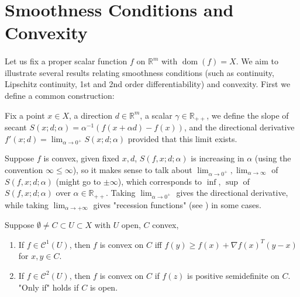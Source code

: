 \section{Smoothness Conditions and Convexity}
\label{sect:022}

\paragraph{}Let us fix a proper scalar function $f$ on $\mathbb{R}^m$ with $\operatorname{dom}(f)=X$. We aim to illustrate several results relating smoothness conditions (such as continuity, Lipschitz continuity, 1st and 2nd order differentiability) and convexity. First we define a common construction:

\begin{defn}\label{defn:022-secant-slope}
	Fix a point $x\in X$, a direction $d\in \mathbb{R}^m$, a scalar $\gamma \in \mathbb{R}_{++}$, we define the slope of secant $S(x; d; \alpha)=\alpha^{-1}(f(x+\alpha d)-f(x))$, and the directional derivative $f'(x; d)=\lim_{\alpha \to 0^+}S(x;d; \alpha )$ provided that this limit exists.
\end{defn}

\begin{rmrk}Suppose $f$ is convex, given fixed $x, d$, $S(f,x; d; \alpha)$ is increasing in $\alpha$ (using the convention $\infty\leq \infty$), so it makes sense to talk about $\lim_{\alpha \to0^+},\lim_{\alpha \to\infty}$ of $S(f,x; d; \alpha )$ (might go to $\pm\infty$), which corresponds to $\inf$, $\sup$ of $S(f,x; d; \alpha )$ over $\alpha \in \mathbb{R}_{++}$. Taking $\lim_{\alpha \to 0^+}$ gives the directional derivative, while taking $\lim_{\alpha \to +\infty}$ gives "recession functions" (see ) in some cases.
\end{rmrk}

\begin{prop}
	\label{prop:022-ordered-conditions-convexity}
	Suppose $\emptyset\neq C\subset U\subset X$ with $U$ open, $C$ convex,
	\begin{enumerate}[label=(\alph*)]
		\item If $f\in\mathscr{C}^1(U)$, then $f$ is convex on $C$ iff $f(y)\geq f(x)+\nabla f(x)^T(y-x)$ for $x,y\in C$.
		\item If $f\in\mathscr{C}^2(U)$, then $f$ is convex on $C$ if $f(z)$ is positive semidefinite on $C$. "Only if" holds if $C$ is open.
	\end{enumerate}
\end{prop}

